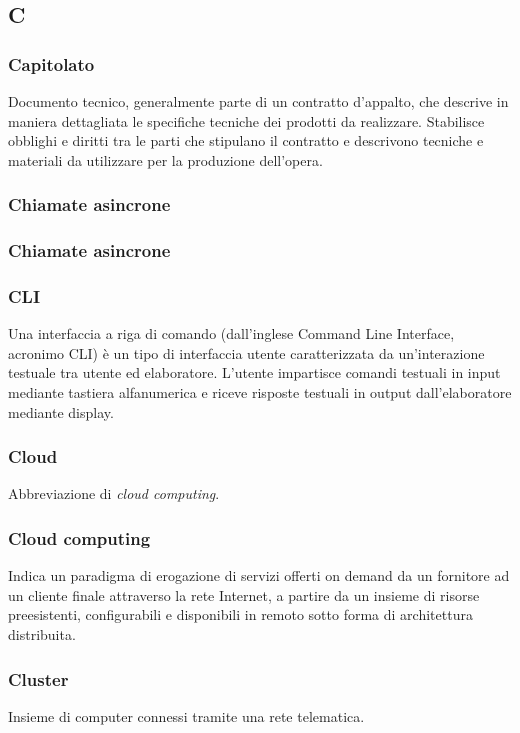 \subsection*{\textbf{\hfill \Huge{C} \hfill}} 
\subsubsection*{Capitolato}
Documento tecnico, generalmente parte di un contratto d’appalto, che descrive in maniera dettagliata le specifiche tecniche dei prodotti da realizzare. Stabilisce obblighi e diritti tra le parti che stipulano il contratto e descrivono tecniche e materiali da utilizzare per la produzione dell’opera.
\subsubsection*{Chiamate asincrone}

\subsubsection*{Chiamate asincrone}

\subsubsection*{CLI}
Una interfaccia a riga di comando (dall’inglese Command Line Interface, acronimo CLI) è un tipo di interfaccia utente caratterizzata da un’interazione testuale tra utente ed elaboratore. L’utente impartisce comandi testuali in input mediante tastiera alfanumerica e riceve risposte testuali in output dall’elaboratore mediante display.
\subsubsection*{Cloud}
Abbreviazione di \textit{cloud computing}\glos .
\subsubsection*{Cloud computing}
Indica un paradigma di erogazione di servizi offerti on demand da un fornitore ad un cliente finale attraverso la rete Internet, a partire da un insieme di risorse preesistenti, configurabili e disponibili in remoto sotto forma di architettura distribuita.
\subsubsection*{Cluster}
Insieme di computer connessi tramite una rete telematica.

